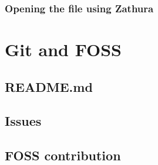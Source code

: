 \documentclass[12pt]{article}
\begin{document}
        \subsubsection{Opening the file using Zathura}

\section{Git and FOSS}
    \subsection{README.md}
    \subsection{Issues}
    \subsection{FOSS contribution}
\end{document}
